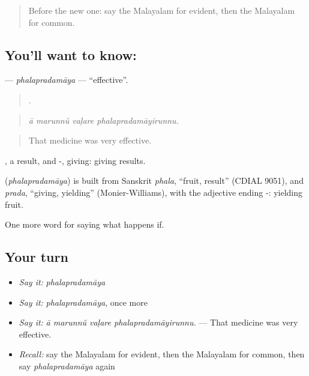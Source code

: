 \label{lesson:ML-C446-phalapradamaya}



\begin{quote}
Before the new one: say the Malayalam for evident, then the Malayalam for common.
\end{quote}

\subsection*{You'll want to know: }
\textbf{} — \emph{phalapradamāya} — \textquotedblleft{}effective\textquotedblright{}.

\begin{quote}
   .
\end{quote}

\begin{quote}
\emph{ā marunnŭ vaḷare phalapradamāyirunnu.}
\end{quote}

\begin{quote}
That medicine was very effective.
\end{quote}

, a result, and -, giving: giving results.

\begin{cousinweb}
\textbf{} (\emph{phalapradamāya}) is built from Sanskrit \emph{phala}, \textquotedblleft{}fruit, result\textquotedblright{} (CDIAL 9051), and \emph{prada}, \textquotedblleft{}giving, yielding\textquotedblright{} (Monier-Williams), with the adjective ending -: yielding fruit.
\end{cousinweb}

\begin{grammarlens}[title={What you've built}]
One more word for saying what happens if.
\end{grammarlens}

\subsection*{Your turn}
\begin{itemize}
\raggedright
  \item \emph{Say it:} \emph{phalapradamāya}
  \item \emph{Say it:} \emph{phalapradamāya}, once more
  \item \emph{Say it:} \emph{ā marunnŭ vaḷare phalapradamāyirunnu.} — That medicine was very effective.
  \item \emph{Recall:} say the Malayalam for evident, then the Malayalam for common, then say \emph{phalapradamāya} again
\end{itemize}

